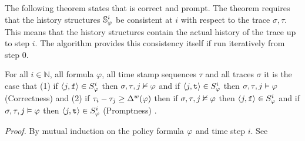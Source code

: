 The following theorem states that \monitor is correct and prompt. The theorem requires that the history structures $\mathbb{S}^{i}_{\varphi}$ be consistent at $i$ with respect to the trace $\sigma,\tau$. This means that the history structures contain the actual history of the trace up to step $i$. The algorithm provides this consistency itself if run iteratively from step $0$.

\begin{theorem}
For all $i \in \mathbb{N}$, all formula $\varphi$, all time stamp sequences $\tau$ and all traces $\sigma$ it is the case that (1) if $\langle j, \mathrm{\texttt{f}} \rangle \in {S}^{i}_{\varphi}$ then $\sigma, \tau, j \nvDash \varphi$ and if $\langle j, \mathrm{\texttt{t}} \rangle \in {S}^{i}_{\varphi}$ then $\sigma, \tau, j \vDash \varphi$ (Correctness) and (2) if $\tau_i - \tau_j \geq \Delta^w(\varphi)$ then if $\sigma, \tau, j \nvDash \varphi$ then $\langle j, \mathrm{\texttt{f}} \rangle \in {S}^{i}_{\varphi}$ and if $\sigma, \tau, j \vDash \varphi$ then $\langle j, \mathrm{\texttt{t}} \rangle \in {S}^{i}_{\varphi}$ (Promptness)
.
\end{theorem}
\textit{Proof.} By mutual induction on the policy formula $\varphi$ and time step $i$. See \cite{Kane2015} \\

%
